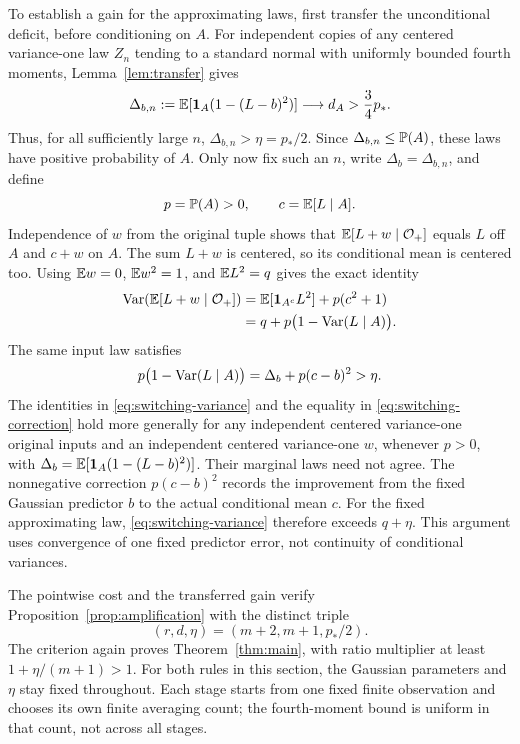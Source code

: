 To establish a gain for the approximating laws, first transfer the
unconditional deficit, before conditioning on $A$. For independent
copies of any centered variance-one law $Z_n$ tending to a standard
normal with uniformly bounded fourth moments, Lemma~\ref{lem:transfer} gives
\[
 \Delta_{b,n}:=\mathbb E[\mathbf 1_A(1-(L-b)^2)]
 \longrightarrow d_A>\frac34p_*.
\]
Thus, for all sufficiently large $n$, $\Delta_{b,n}>\eta=p_*/2$.
Since $\Delta_{b,n}\le\mathbb P(A)$, these laws have positive probability
of $A$. Only now fix such an $n$, write $\Delta_b=\Delta_{b,n}$, and define
\[
 p=\mathbb P(A)>0,\qquad c=\mathbb E[L\mid A].
\]
Independence of $w$ from the original tuple shows that
$\mathbb E[L+w\mid\mathcal O_+]$ equals $L$ off $A$ and $c+w$ on $A$.
The sum $L+w$ is centered, so its conditional mean is centered too.
Using $\mathbb E w=0$, $\mathbb E w^2=1$, and $\mathbb E L^2=q$ gives the exact identity
\begin{align}
 \operatorname{Var}(\mathbb E[L+w\mid\mathcal O_+])
 &=\mathbb E[\mathbf 1_{A^c}L^2]+p(c^2+1)\notag\\
 &=q+p\bigl(1-\operatorname{Var}(L\mid A)\bigr).
 \label{eq:switching-variance}
\end{align}
The same input law satisfies
\begin{equation}\label{eq:switching-correction}
 p\bigl(1-\operatorname{Var}(L\mid A)\bigr)
 =\Delta_b+p(c-b)^2>\eta.
\end{equation}
The identities in \eqref{eq:switching-variance} and the equality in
\eqref{eq:switching-correction} hold more generally for any independent
centered variance-one original inputs and an independent centered
variance-one $w$, whenever $p>0$, with
$\Delta_b=\mathbb E[\mathbf 1_A(1-(L-b)^2)]$. Their marginal laws need not agree.
The nonnegative correction $p(c-b)^2$ records the improvement from
the fixed Gaussian predictor $b$ to the actual conditional mean $c$.
For the fixed approximating law, \eqref{eq:switching-variance}
therefore exceeds $q+\eta$.
This argument uses convergence of one fixed predictor error, not
continuity of conditional variances.

The pointwise cost and the transferred gain verify
Proposition~\ref{prop:amplification} with the distinct triple
\[
 (r,d,\eta)=(m+2,m+1,p_*/2).
\]
The criterion again proves Theorem~\ref{thm:main}, with ratio
multiplier at least $1+\eta/(m+1)>1$. For both rules in this section,
the Gaussian parameters and $\eta$ stay fixed throughout. Each stage
starts from one fixed finite observation and chooses its own finite
averaging count; the fourth-moment bound is uniform in that count,
not across all stages.
